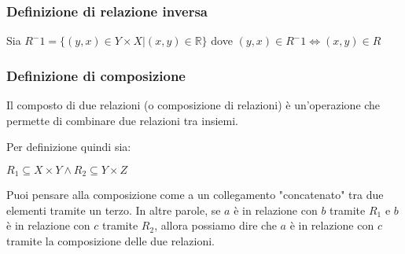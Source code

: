 \documentclass[article,12pt]{book}
\begin{document}
\begin{enumerate}
\subsubsection{Definizione di relazione inversa}
\begin{center}
    Sia $R^-1 = \{(y,x) \in Y \times X | (x,y) \in \mathbb{R} \}$ dove $(y,x) \in R^-1 \iff (x,y) \in R$
\end{center}

\subsubsection{Definizione di composizione}
Il composto di due relazioni (o composizione di relazioni) è un'operazione che permette di combinare due relazioni tra insiemi. \\

\begin{center}
\end{center}
Per definizione quindi sia:
    \begin{center}
        $R_1 \subseteq X \times Y \land R_2 \subseteq Y \times Z$
    \end{center}

Puoi pensare alla composizione come a un collegamento "concatenato" tra due elementi tramite un terzo. In altre parole, se \( a \) è in relazione con \( b \) tramite \( R_1 \) e \( b \) è in relazione con \( c \) tramite \( R_2 \), allora possiamo dire che \( a \) è in relazione con \( c \) tramite la composizione delle due relazioni. \\


\end{enumerate}
\end{document}
